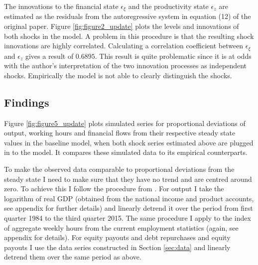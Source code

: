 The innovations to the financial state \(\epsilon_{\xi}\) and the productivity
state \(\epsilon_{z}\) are estimated as the residuals from the autoregressive
system in equation (12) of the original paper. Figure \ref{fig:figure2_update}
plots the levels and innovations of both shocks in the model. A problem in this
procedure is that the resulting shock innovations are highly
correlated. Calculating a correlation coefficient between \(\epsilon_{\xi}\)
and \(\epsilon_z\) gives a result of $0.6895$. This result is
quite problematic since it is at odds with the author's interpretation of the
two innovation processes as independent shocks. Empirically the model is not
able to clearly distinguish the shocks.

\subsection{Findings}
\label{sec:findings}

Figure \ref{fig:figure5_update} plots simulated series for proportional
deviations of output, working hours and financial flows from their respective
steady state values in the baseline model, when both shock series estimated
above are plugged in to the model. It compares these simulated data to its
empirical counterparts. 



To make the observed data comparable to proportional deviations from the steady
state I need to make sure that they have no trend and are centred around
zero. To achieve this I follow the procedure from
\textcite{jerman_macroeconomic_2012}. For output I take the logarithm of real
GDP (obtained from the national income and product accounts, see appendix for
further details) and linearly detrend it over the period from first quarter
1984 to the third quarter 2015. The same procedure I apply to the index of
aggregate weekly hours from the current employment statistics (again, see
appendix for details). For equity payouts and debt repurchases and equity
payouts I use the data series constructed in Section \ref{sec:data} and
linearly detrend them over the same period as above.
